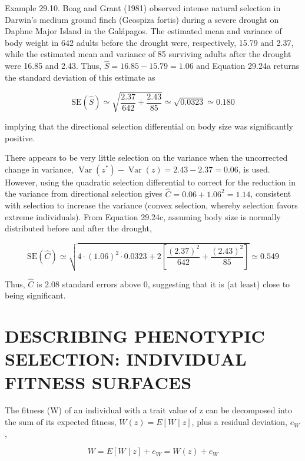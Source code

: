 \documentclass{article}
\begin{document}
Example 29.10. Boag and Grant (1981) observed intense natural selection in Darwin's medium ground finch (Geospiza fortis) during a severe drought on Daphne Major Island in the Galápagos. The estimated mean and variance of body weight in 642 adults before the drought were, respectively, 15.79 and 2.37, while the estimated mean and variance of 85 surviving adults after the drought were 16.85 and 2.43. Thus,  $ \widehat{S}=16.85-15.79=1.06 $ and Equation 29.24a returns the standard deviation of this estimate as

\begin{equation}
\mathrm{SE}\left(\widehat{S}\right)\simeq\sqrt{\frac{2.37}{642}+\frac{2.43}{85}}\simeq\sqrt{0.0323}\simeq0.180
\end{equation}

implying that the directional selection differential on body size was significantly positive.

There appears to be very little selection on the variance when the uncorrected change in variance,  $ \operatorname{Var}(z^*) - \operatorname{Var}(z) = 2.43 - 2.37 = 0.06 $, is used. However, using the quadratic selection differential to correct for the reduction in the variance from directional selection gives  $ \widehat{C} = 0.06 + 1.06^2 = 1.14 $, consistent with selection to increase the variance (convex selection, whereby selection favors extreme individuals). From Equation 29.24c, assuming body size is normally distributed before and after the drought,

\begin{equation}
\mathrm{SE}\left(\widehat{C}\right)\simeq\sqrt{4\cdot(1.06)^{2}\cdot0.0323+2\left[\frac{(2.37)^{2}}{642}+\frac{(2.43)^{2}}{85}\right]}\simeq0.549
\end{equation}

Thus,  $ \widehat{C} $ is 2.08 standard errors above 0, suggesting that it is (at least) close to being significant.

\section{DESCRIBING PHENOTYPIC SELECTION: INDIVIDUAL FITNESS SURFACES}
The fitness (W) of an individual with a trait value of z can be decomposed into the sum of its expected fitness,  $ W(z) = E[W \mid z] $, plus a residual deviation,  $ e_W $,

\begin{equation}
W=E[W\mid z]+e_{W}=W(z)+e_{W}
\end{equation}
\end{document}
